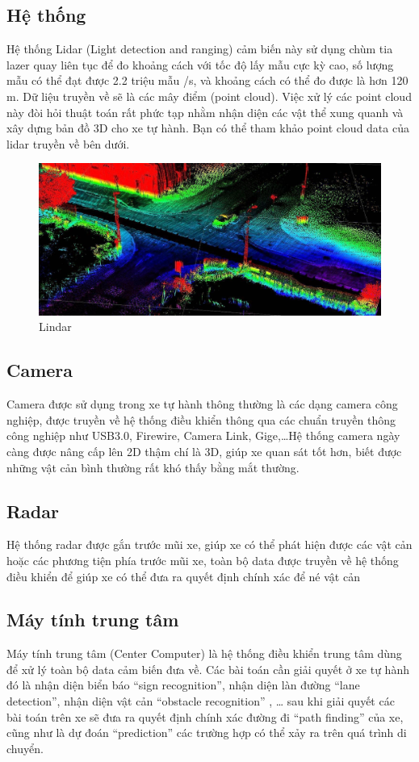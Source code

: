 \documentclass{article}
\begin{document}
\subsection{Hệ thống }
Hệ thống Lidar (Light detection and ranging) cảm biến này sử dụng chùm tia lazer quay liên tục để đo khoảng cách với tốc độ lấy mẫu cực kỳ cao, số lượng mẫu có thể đạt được 2.2 triệu mẫu /s, và khoảng cách có thể đo được là hơn 120 m. Dữ liệu truyền về sẽ là các mây điểm (point cloud). Việc xử lý các point cloud này đòi hỏi thuật toán rất phức tạp nhằm nhận diện các vật thể xung quanh và xây dựng bản đồ 3D cho xe tự hành. Bạn có thể tham khảo point cloud data của lidar truyền về bên dưới.
\begin{figure}[h]
\centering 
\includegraphics[width=150mm]{5.jpeg} 
\caption{Lindar} 
\label{dinhnghia} 
\end{figure}
\subsection{Camera}
Camera được sử dụng trong xe tự hành thông thường là các dạng camera công nghiệp, được truyền về hệ thống điều khiển thông qua các chuẩn truyền thông công nghiệp như USB3.0, Firewire, Camera Link, Gige,…Hệ thống camera ngày càng được nâng cấp lên 2D thậm chí là 3D, giúp xe quan sát tốt hơn, biết được những vật cản bình thường rất khó thấy bằng mắt thường.
\subsection{Radar}
Hệ thống radar được gắn trước mũi xe, giúp xe có thể phát hiện được các vật cản hoặc các phương tiện phía trước mũi xe, toàn bộ data được truyền về hệ thống điều khiển để giúp xe có thể đưa ra quyết định chính xác để né vật cản
\subsection{Máy tính trung tâm}
Máy tính trung tâm (Center Computer) là hệ thống điều khiển trung tâm dùng để xử lý toàn bộ data cảm biến  đưa về. Các bài toán cần giải quyết ở xe tự hành đó là nhận diện biển báo “sign recognition”, nhận diện làn đường “lane detection”, nhận diện vật cản “obstacle recognition” , … sau khi giải quyết các bài toán trên xe sẽ đưa ra quyết định chính xác đường đi “path finding” của xe, cũng như là dự đoán “prediction” các trường hợp có thể xảy ra trên quá trình di chuyển.
\end{document}
